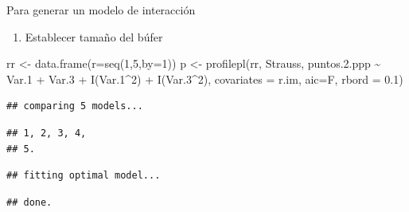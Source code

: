 \documentclass[
  11pt,
  ignorenonframetext,
]{beamer}
\newenvironment{Shaded}{}{}
\newcommand{\AttributeTok}[1]{\textcolor[rgb]{0.49,0.56,0.16}{#1}}
\newcommand{\DecValTok}[1]{\textcolor[rgb]{0.25,0.63,0.44}{#1}}
\newcommand{\FloatTok}[1]{\textcolor[rgb]{0.25,0.63,0.44}{#1}}
\newcommand{\FunctionTok}[1]{\textcolor[rgb]{0.02,0.16,0.49}{#1}}
\newcommand{\NormalTok}[1]{#1}
\newcommand{\OtherTok}[1]{\textcolor[rgb]{0.00,0.44,0.13}{#1}}
\newcommand{\SpecialCharTok}[1]{\textcolor[rgb]{0.25,0.44,0.63}{#1}}
\providecommand{\tightlist}{%
  \setlength{\itemsep}{0pt}\setlength{\parskip}{0pt}}
\begin{document}
\begin{frame}[fragile]{Para generar un modelo de interacción}
\protect\hypertarget{para-generar-un-modelo-de-interacciuxf3n}{}
\begin{enumerate}
\tightlist
\item
  Establecer tamaño del búfer
\end{enumerate}

\begin{Shaded}
\begin{Highlighting}[]
\NormalTok{rr }\OtherTok{\textless{}{-}} \FunctionTok{data.frame}\NormalTok{(}\AttributeTok{r=}\FunctionTok{seq}\NormalTok{(}\DecValTok{1}\NormalTok{,}\DecValTok{5}\NormalTok{,}\AttributeTok{by=}\DecValTok{1}\NormalTok{))}
\NormalTok{p }\OtherTok{\textless{}{-}} \FunctionTok{profilepl}\NormalTok{(rr, Strauss, }
\NormalTok{               puntos.}\FloatTok{2.}\NormalTok{ppp }\SpecialCharTok{\textasciitilde{}}\NormalTok{ Var}\FloatTok{.1} \SpecialCharTok{+}\NormalTok{ Var}\FloatTok{.3} \SpecialCharTok{+} \FunctionTok{I}\NormalTok{(Var}\FloatTok{.1}\SpecialCharTok{\^{}}\DecValTok{2}\NormalTok{) }\SpecialCharTok{+} \FunctionTok{I}\NormalTok{(Var}\FloatTok{.3}\SpecialCharTok{\^{}}\DecValTok{2}\NormalTok{),}
          \AttributeTok{covariates =}\NormalTok{ r.im, }\AttributeTok{aic=}\NormalTok{F, }\AttributeTok{rbord =} \FloatTok{0.1}\NormalTok{)}
\end{Highlighting}
\end{Shaded}

\begin{verbatim}
## comparing 5 models...
\end{verbatim}

\begin{verbatim}
## 1, 2, 3, 4, 
## 5.
\end{verbatim}

\begin{verbatim}
## fitting optimal model...
\end{verbatim}

\begin{verbatim}
## done.
\end{verbatim}
\end{frame}
\end{document}
